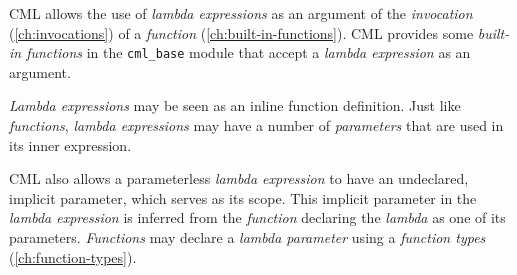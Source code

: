 CML allows the use of \emph{lambda expressions}
as an argument of the \emph{invocation} (\ref{ch:invocations})
of a \emph{function} (\ref{ch:built-in-functions}).
CML provides some \emph{built-in functions} in the \verb|cml_base| module
that accept a \emph{lambda expression} as an argument.

\emph{Lambda expressions} may be seen as an inline function definition.
Just like \emph{functions},
\emph{lambda expressions} may have a number of \emph{parameters}
that are used in its inner expression.

CML also allows a parameterless \emph{lambda expression}
to have an undeclared, implicit parameter,
which serves as its scope.
This implicit parameter in the \emph{lambda expression}
is inferred from the \emph{function}
declaring the \emph{lambda} as one of its parameters.
\emph{Functions} may declare a \emph{lambda parameter}
using a \emph{function types} (\ref{ch:function-types}).
